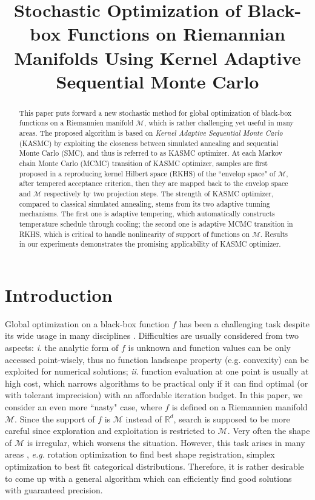\documentclass{article}
\title{Stochastic Optimization of Black-box Functions on Riemannian Manifolds Using Kernel Adaptive Sequential Monte Carlo}
\author{} %
\begin{document}
\maketitle

\begin{abstract}
This paper puts forward a new stochastic method for global optimization of black-box functions on a Riemannien manifold $\mathcal{M}$,   
which is rather challenging yet useful in many areas. The proposed algorithm is based on \emph{Kernel Adaptive Sequential 
Monte Carlo} (KASMC) by exploiting the closeness between simulated annealing and sequential Monte Carlo (SMC), and thus is referred to as KASMC optimizer.             
At each Markov chain Monte Carlo (MCMC) transition of KASMC optimizer, samples are first proposed in a reproducing kernel Hilbert space (RKHS) of the ``envelop space" 
of $\mathcal{M}$, after tempered acceptance criterion, then they are mapped back to the envelop space and $\mathcal{M}$ respectively by two projection steps.     
The strength of KASMC optimizer, compared to classical simulated annealing, stems from its two adaptive  
tunning mechanisms. The first one is adaptive tempering, which automatically constructs temperature schedule through cooling; 
the second one is adaptive MCMC transition in RKHS, which is 
critical to handle nonlinearity of support of functions on $\mathcal{M}$. Results in our experiments demonstrates the 
promising applicability of KASMC optimizer. 
\end{abstract}

\section{Introduction}
Global optimization on a black-box function $f$ has been a challenging task  
despite its wide usage in many disciplines \citep{black_box_optimization, black_box_optimization_book}.    
Difficulties are usually considered from two aspects: \emph{i}. the analytic form of $f$ is unknown and function values can 
be only accessed point-wisely, thus no function landscape property (e.g. convexity) can be exploited for numerical solutions;     
\emph{ii}. function evaluation at one point is usually at high cost, which narrows algorithms to be practical only if it can find 
optimal (or with tolerant imprecision) with an affordable iteration budget. In this paper, we consider an even more ``nasty" case, where 
$f$ is defined on a Riemannien manifold $\mathcal{M}$. Since the support of $f$ is $\mathcal{M}$ instead of $\mathbb{R}^d$, search     
is supposed to be more careful since exploration and exploitation is restricted to $\mathcal{M}$.       
Very often the shape of $\mathcal{M}$ is irregular, which worsens the situation.       
However, this task arises in many areas \citep{SA_registration, Geo_MCMC}, 
\emph{e.g.} rotation optimization to find best shape registration, simplex optimization to best fit categorical 
distributions. Therefore, it is rather desirable to come up with a general algorithm which can efficiently find good solutions with guaranteed precision. 
\end{document}
